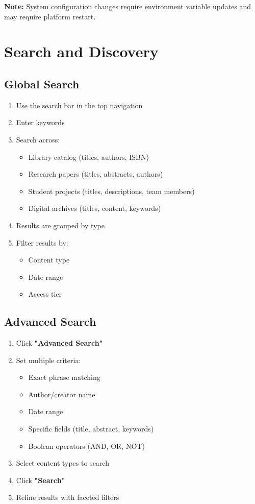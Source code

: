 \documentclass[12pt,a4paper]{article}
\begin{document}
\textbf{Note:} System configuration changes require environment variable updates and may require platform restart.

\newpage

\section{Search and Discovery}

\subsection{Global Search}
\begin{enumerate}[leftmargin=*]
    \item Use the search bar in the top navigation
    \item Enter keywords
    \item Search across:
        \begin{itemize}
            \item Library catalog (titles, authors, ISBN)
            \item Research papers (titles, abstracts, authors)
            \item Student projects (titles, descriptions, team members)
            \item Digital archives (titles, content, keywords)
        \end{itemize}
    \item Results are grouped by type
    \item Filter results by:
        \begin{itemize}
            \item Content type
            \item Date range
            \item Access tier
        \end{itemize}
\end{enumerate}

\subsection{Advanced Search}
\begin{enumerate}[leftmargin=*]
    \item Click \textbf{"Advanced Search"}
    \item Set multiple criteria:
        \begin{itemize}
            \item Exact phrase matching
            \item Author/creator name
            \item Date range
            \item Specific fields (title, abstract, keywords)
            \item Boolean operators (AND, OR, NOT)
        \end{itemize}
    \item Select content types to search
    \item Click \textbf{"Search"}
    \item Refine results with faceted filters
\end{enumerate}
\end{document}
